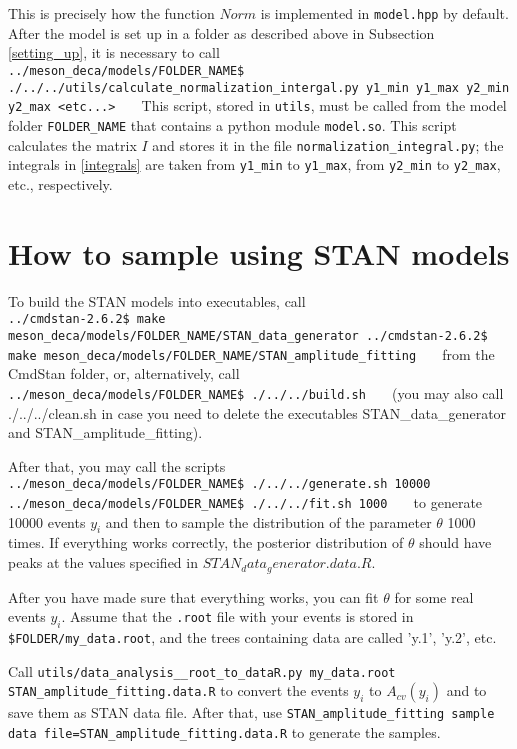 \documentclass[a4paper]{article}
\begin{document}
This is precisely how the function $Norm$ is implemented in \texttt{model.hpp} by default. After the model is set up in 
a folder as described above in Subsection \ref{setting_up}, it is necessary to call
\texttt{
\,\\
\qquad ../meson\_deca/models/FOLDER\_NAME\$ ./../../utils/calculate\_normalization\_intergal.py y1\_min y1\_max y2\_min y2\_max <etc...>
\,
}
This script, stored in \texttt{utils}, must be called from the model folder \texttt{FOLDER\_NAME} that contains a python module \texttt{model.so}. This script calculates the matrix $I$ and stores it in the file \texttt{normalization\_integral.py}; the 
integrals in \eqref{integrals} are taken from \texttt{y1\_min} to \texttt{y1\_max}, from \texttt{y2\_min} to \texttt{y2\_max}, etc., 
respectively.



\section{How to sample using STAN models}
To build the STAN models into executables, call
\texttt{
\,\\
\qquad ../cmdstan-2.6.2\$ make meson\_deca/models/FOLDER\_NAME/STAN\_data\_generator
\qquad ../cmdstan-2.6.2\$ make meson\_deca/models/FOLDER\_NAME/STAN\_amplitude\_fitting
\,
}
from the CmdStan folder, or, alternatively, call
\texttt{
\,\\
\qquad ../meson\_deca/models/FOLDER\_NAME\$ ./../../build.sh
\,
}
(you may also call ./../../clean.sh in case you need to delete the executables 
STAN\_data\_generator and STAN\_amplitude\_fitting).

After that, you may call the scripts
\texttt{
\,\\
\qquad ../meson\_deca/models/FOLDER\_NAME\$ ./../../generate.sh 10000
\qquad ../meson\_deca/models/FOLDER\_NAME\$ ./../../fit.sh 1000
\,
}
to generate 10000 events $y_i$ and then to sample the distribution of the
parameter $\theta$ 1000 times. If everything works correctly, the posterior
distribution of $\theta$ should have peaks at the values specified in
$STAN_data_generator.data.R$.

After you have made sure that everything works,
you can fit $\theta$ for some real events $y_i$. Assume that the 
\texttt{.root} file with your events is stored in \texttt{\$FOLDER/my\_data.root},
and the trees containing data are called 'y.1', 'y.2', etc.

Call \texttt{utils/data\_analysis\_\_root\_to\_dataR.py my\_data.root STAN\_amplitude\_fitting.data.R}
to convert the events $y_i$ to $A_{cv}(y_i)$ and to save them as STAN data file. After that,
use \texttt{STAN\_amplitude\_fitting sample data file=STAN\_amplitude\_fitting.data.R} 
to generate the samples. 
\end{document}
